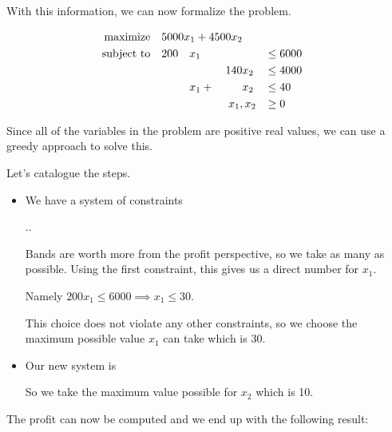 \documentclass[12pt,letterpaper]{article}
\begin{document}
\begin{enumerate}
      With this information, we can now formalize the problem.

      \begin{alignat*}{7}
        \text{maximize}   \quad \rlap{$5000 x_1 + 4500 x_2$}                              \\
        \text{subject to} \quad & 200 & x_1 &       &     &                   && \leq 6000 \\
                                &     &     &       & 140 & x_2               && \leq 4000 \\
                                &     & x_1 & {}+{} &     & x_2               && \leq 40   \\
                                &     &     &       &     & \clap{$x_1, x_2$} && \geq 0    \\
      \end{alignat*}

      Since all of the variables in the problem are positive real values,
      we can use a greedy approach to solve this.

      Let's catalogue the steps.

      \begin{itemize}
        \item
          We have a system of constraints

          \sysdelim..

          Bands are worth more from the profit perspective, so we take as many as possible.
          Using the first constraint, this gives us a direct number for $x_1$.

          Namely $200 x_1 \leq 6000 \implies x_1 \leq 30$.

          This choice does not violate any other constraints,
          so we choose the maximum possible value $x_1$ can take which is 30.

        \item
          Our new system is


          So we take the maximum value possible for $x_2$ which is 10.
      \end{itemize}

      The profit can now be computed and we end up with the following result:


\end{enumerate}
\end{document}

